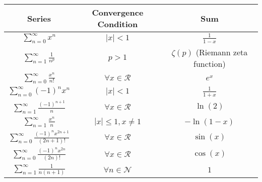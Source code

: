 \documentclass{article}
\begin{document}
\renewcommand{\arraystretch}{1.5}
\begin{center}
    \begin{tabular}{|c|c|c|}
        \hline
        \textbf{Series}                                       & \textbf{Convergence Condition} & \textbf{Sum}                       \\
        \hline
        $\sum_{n=0}^{\infty} x^n$                             & $|x| < 1$                      & $\frac{1}{1-x}$                    \\
        \hline
        $\sum_{n=1}^{\infty} \frac{1}{n^p}$                   & $p > 1$                        & $\zeta(p)$ (Riemann zeta function) \\
        \hline
        $\sum_{n=0}^{\infty} \frac{x^n}{n!}$                  & $\forall x \in \mathcal{R}$    & $e^x$                              \\
        \hline
        $\sum_{n=0}^{\infty} (-1)^n x^n$                      & $|x| < 1$                      & $\frac{1}{1+x}$                    \\
        \hline
        $\sum_{n=1}^{\infty} \frac{(-1)^{n+1}}{n}$            & $\forall x \in \mathcal{R}$    & $\ln(2)$                           \\
        \hline
        $\sum_{n=1}^{\infty} \frac{x^n}{n}$                   & $|x| \leq 1, x \neq 1$         & $-\ln(1-x)$                        \\
        \hline
        $\sum_{n=0}^{\infty} \frac{(-1)^n x^{2n+1}}{(2n+1)!}$ & $\forall x \in \mathcal{R}$    & $\sin(x)$                          \\
        \hline
        $\sum_{n=0}^{\infty} \frac{(-1)^n x^{2n}}{(2n)!}$     & $\forall x \in \mathcal{R}$    & $\cos(x)$                          \\
        \hline
        $\sum_{n=1}^{\infty} \frac{1}{n(n+1)}$                & $\forall n \in \mathcal{N}$    & $1$                                \\
        \hline
    \end{tabular}
\end{center}
\end{document}
